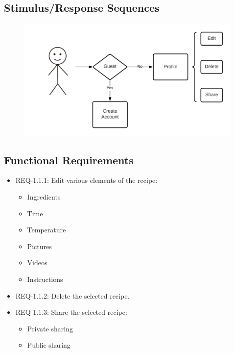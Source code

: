 \documentclass{scrreprt}
\begin{document}
\subsection{Stimulus/Response Sequences}

\begin{figure}[H]\centering
    \includegraphics[width=\columnwidth]{FlowCharts/Recipe-Creation.png}
\end{figure}

\subsection{\gls{Functional Requirements}}

\begin{itemize}
    \item REQ-1.1.1: Edit various elements of the recipe:
          \begin{itemize}
              \item Ingredients
              \item Time
              \item Temperature
              \item Pictures
              \item Videos
              \item Instructions
          \end{itemize}
    \item REQ-1.1.2: Delete the selected recipe.
    \item REQ-1.1.3: Share the selected recipe:
          \begin{itemize}
              \item Private sharing
              \item Public sharing
          \end{itemize}
\end{itemize}
\end{document}
